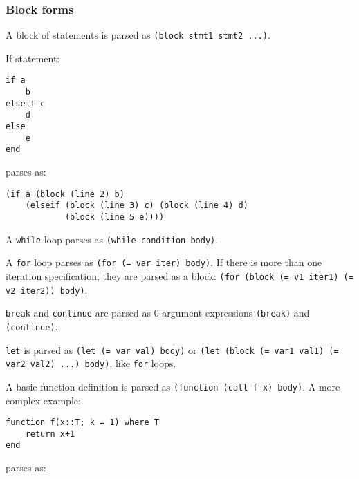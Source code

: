 \hypertarget{12573206411049142153}{}


\subsubsection{Block forms}



A block of statements is parsed as \texttt{(block stmt1 stmt2 ...)}.



If statement:




\begin{verbatim}
if a
    b
elseif c
    d
else
    e
end
\end{verbatim}



parses as:




\begin{lstlisting}
(if a (block (line 2) b)
    (elseif (block (line 3) c) (block (line 4) d)
            (block (line 5 e))))
\end{lstlisting}



A \texttt{while} loop parses as \texttt{(while condition body)}.



A \texttt{for} loop parses as \texttt{(for (= var iter) body)}. If there is more than one iteration specification, they are parsed as a block: \texttt{(for (block (= v1 iter1) (= v2 iter2)) body)}.



\texttt{break} and \texttt{continue} are parsed as 0-argument expressions \texttt{(break)} and \texttt{(continue)}.



\texttt{let} is parsed as \texttt{(let (= var val) body)} or \texttt{(let (block (= var1 val1) (= var2 val2) ...) body)}, like \texttt{for} loops.



A basic function definition is parsed as \texttt{(function (call f x) body)}. A more complex example:




\begin{verbatim}
function f(x::T; k = 1) where T
    return x+1
end
\end{verbatim}



parses as:




